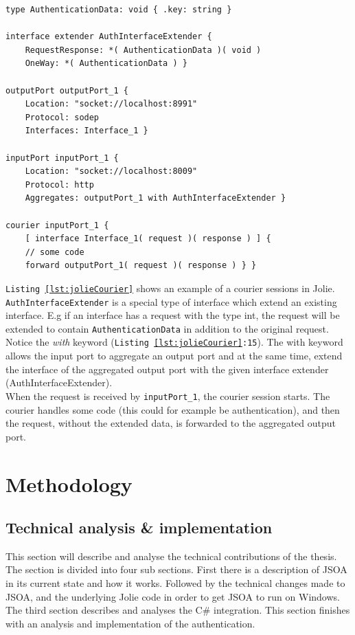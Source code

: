 \documentclass[12pt,a4paper]{article}
\begin{document}
\begin{lstlisting}[caption={Jolie courier},label={lst:jolieCourier}]
type AuthenticationData: void { .key: string }

interface extender AuthInterfaceExtender {
	RequestResponse: *( AuthenticationData )( void ) 
	OneWay: *( AuthenticationData ) }

outputPort outputPort_1 {
	Location: "socket://localhost:8991"
	Protocol: sodep
	Interfaces: Interface_1 }

inputPort inputPort_1 {
	Location: "socket://localhost:8009"
	Protocol: http
	Aggregates: outputPort_1 with AuthInterfaceExtender }

courier inputPort_1 {
	[ interface Interface_1( request )( response ) ] {
	// some code
	forward outputPort_1( request )( response ) } }
\end{lstlisting}
\texttt{Listing \ref{lst:jolieCourier}} shows an example of a courier sessions in Jolie. \\ \texttt{AuthInterfaceExtender} is a special type of interface which extend an existing interface. E.g if an interface has a request with the type int, the request will be extended to contain  \texttt{AuthenticationData} in addition to the original request. \\
Notice the \emph{with} keyword (\texttt{Listing \ref{lst:jolieCourier}:15}). The with keyword allows the input port to aggregate an output port and at the same time, extend the interface of the aggregated output port with the given interface extender (AuthInterfaceExtender). \\
When the request is received by \texttt{inputPort\_1}, the courier session starts. The courier handles some code (this could for example be authentication), and then the request, without the extended data, is forwarded to the aggregated output port.

\newpage
\section{Methodology}\label{sec:Methodology}
\subsection{Technical analysis \& implementation}\label{subsec:TechnicalAnalysis}
This section will describe and analyse the technical contributions of the thesis.\\
The section is divided into four sub sections. First there is a description of JSOA in its current state and how it works. Followed by the technical changes made to JSOA, and the underlying Jolie code in order to get JSOA to run on Windows. The third section describes and analyses the C\# integration. This section finishes with an analysis and implementation of the authentication.
\end{document}
